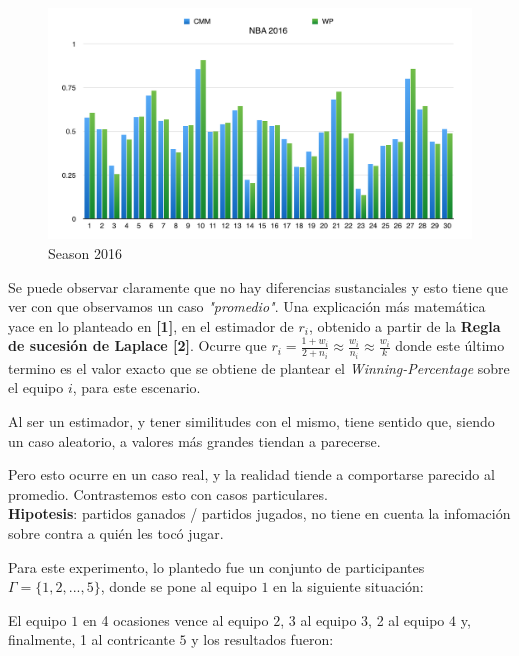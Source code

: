 \newpage

\begin{figure}[h!]
  \begin{center}
	\includegraphics[scale=0.50]{imagenes/cualitative/comparative/nba2016.png}
	\caption{Season 2016}
  \end{center}
\end{figure}

Se puede observar claramente que no hay diferencias sustanciales y esto tiene que ver con que observamos un caso \textit{"promedio"}. Una explicaci\'on m\'as matem\'atica yace en lo planteado en \textbf{[1]}, en el estimador de $r_{i}$, obtenido a partir de la \textbf{Regla de sucesi\'on de Laplace [2]}. Ocurre que $r_{i} = \frac{1 + w_{i}}{2 + n_{i}} \approx \frac{w_{i}}{n_{i}} \approx \frac{w_{i}}{k}$ donde este \'ultimo termino es el valor exacto que se obtiene de plantear el \textit{Winning-Percentage} sobre el equipo $i$, para este escenario. 

Al ser un estimador, y tener similitudes con el mismo, tiene sentido que, siendo un caso aleatorio, a valores m\'as grandes tiendan a parecerse.

Pero esto ocurre en un caso real, y la realidad tiende a comportarse parecido al promedio. Contrastemos esto con casos particulares. \\

\textbf{Hipotesis}: partidos ganados / partidos jugados, no tiene en cuenta la infomaci\'on sobre contra a qui\'en les toc\'o jugar.

Para este experimento, lo plantedo fue un conjunto de participantes $\Gamma = \{1,2,...,5\}$, donde se pone al equipo $1$ en la siguiente situaci\'on:

El equipo $1$ en 4 ocasiones vence al equipo $2$, 3 al equipo $3$, 2 al equipo $4$ y, finalmente, 1 al contricante $5$ y los resultados fueron: \\

